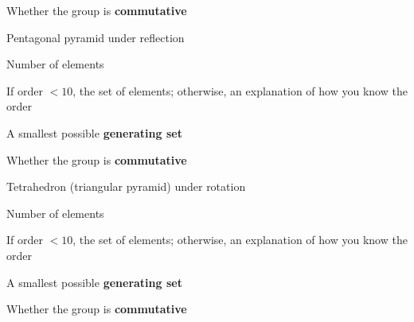 \documentclass[../gatm_answers.tex]{subfiles}
\begin{document}
\begin{inner_problem}
\item Whether the group is \textbf{commutative}
\end{inner_problem}

\begin{outer_problem}
\item Pentagonal pyramid under reflection
\end{outer_problem}

\begin{inner_problem}[start=1]
\item Number of elements
\end{inner_problem}

\begin{inner_problem}
\item If order $< 10$, the set of elements; otherwise, an explanation of how you know the order
\end{inner_problem}

\begin{inner_problem}
\item A smallest possible \textbf{generating set}
\end{inner_problem}

\begin{inner_problem}
\item Whether the group is \textbf{commutative}
\end{inner_problem}

\begin{outer_problem}
\item Tetrahedron (triangular pyramid) under rotation
\end{outer_problem}

\begin{inner_problem}[start=1]
\item Number of elements
\end{inner_problem}

\begin{inner_problem}
\item If order $< 10$, the set of elements; otherwise, an explanation of how you know the order
\end{inner_problem}

\begin{inner_problem}
\item A smallest possible \textbf{generating set}
\end{inner_problem}

\begin{inner_problem}
\item Whether the group is \textbf{commutative}
\end{inner_problem}
\end{document}
